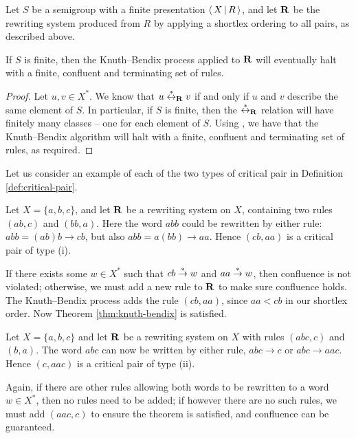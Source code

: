 \begin{theorem}
  Let $S$ be a semigroup with a finite presentation $\left\langle \, X \, \middle| \, R \, \right\rangle$, and let $\mathbf{R}$
  be the rewriting system produced from $R$ by applying a shortlex ordering to
  all pairs, as described above.

  If $S$ is finite, then the Knuth--Bendix process applied to $\mathbf{R}$ will
  eventually halt with a finite, confluent and terminating set of rules.

  \begin{proof}
    Let $u,v \in X^*$.  We know that $u \stackrel{*}{\leftrightarrow}_{\mathbf{R}} v$ if and only if $u$ and
    $v$ describe the same element of $S$.  In particular, if $S$ is finite, then
    the $\stackrel{*}{\leftrightarrow}_{\mathbf{R}}$ relation will have finitely many classes -- one for each
    element of $S$.  Using \cite[Corollary 12.21]{cgt}, we have that
    the Knuth--Bendix algorithm will halt with a finite, confluent and terminating set of
    rules, as required.
  \end{proof}
\end{theorem}

Let us consider an example of each of the two types of critical pair in
Definition \ref{def:critical-pair}.

\begin{example}
  Let $X=\{a,b,c\}$, and let $\mathbf{R}$ be a rewriting system on $X$, containing
  two rules $(ab, c)$ and $(bb, a)$.  Here the word $abb$ could be
  rewritten by either rule: $abb = (ab)b \to cb$, but also
  $abb = a(bb) \to aa$.  Hence $(cb, aa)$ is a critical pair of type (i).

  If there exists some $w \in X^*$ such that $cb \stackrel{*}{\to} w$ and $aa \stackrel{*}{\to} w$,
  then confluence is not violated; otherwise, we must add a new rule to $\mathbf{R}$
  to make sure confluence holds.  The Knuth--Bendix process adds the rule
  $(cb, aa)$, since $aa < cb$ in our shortlex order.  Now Theorem
  \ref{thm:knuth-bendix} is satisfied.
\end{example}

\begin{example}
  Let $X=\{a,b,c\}$ and let $\mathbf{R}$ be a rewriting system on $X$ with rules
  $(abc, c)$ and $(b, a)$.  The word $abc$ can now be written by either rule,
  $abc \to c$ or $abc \to aac$.  Hence $(c, aac)$ is a critical pair of type
  (ii).

  Again, if there are other rules allowing both words to be rewritten to a word
  $w \in X^*$, then no rules need to be added; if however there are no such
  rules, we must add $(aac, c)$ to ensure the theorem is satisfied, and
  confluence can be guaranteed.
\end{example}


